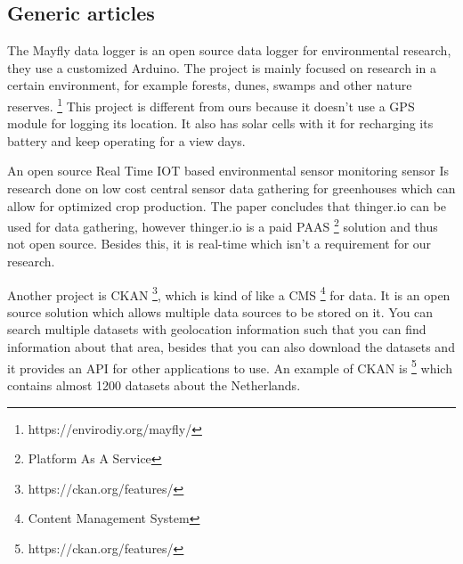 \documentclass[conference]{IEEEtran}
\begin{document}
\subsection{Generic articles}
The Mayfly data logger is an open source data logger for environmental research, they use a customized Arduino. The project is mainly focused on research in a certain environment, for example forests, dunes, swamps and other nature reserves. \footnote{https://envirodiy.org/mayfly/} This project is different from ours because it doesn't use a GPS module for logging its location. It also has solar cells with it for recharging its battery and keep operating for a view days. 
\par
An open source Real Time IOT based environmental sensor monitoring sensor \cite{ICRISET2017:An_open_source_Real} Is research done on low cost central sensor data gathering for greenhouses which can allow for optimized crop production. The paper concludes that thinger.io can be used for data gathering, however thinger.io is a paid PAAS \footnote{Platform As A Service} solution and thus not open source. Besides this, it is real-time which isn't a requirement for our research.
\par
Another project is CKAN \footnote{https://ckan.org/features/}, which is kind of like a CMS \footnote{Content Management System} for data. It is an open source solution which allows multiple data sources to be stored on it. You can search multiple datasets with geolocation information such that you can find information about that area, besides that you can also download the datasets and it provides an API for other applications to use. An example of CKAN is \footnote{https://ckan.org/features/}  which contains almost 1200 datasets about the Netherlands.
\end{document}
